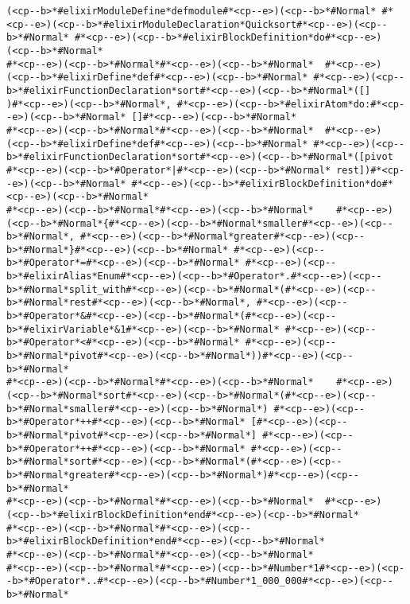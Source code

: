 \begin{lstlisting}[style=carbonpaper]
(<cp--b>*#elixirModuleDefine*defmodule#*<cp--e>)(<cp--b>*#Normal* #*<cp--e>)(<cp--b>*#elixirModuleDeclaration*Quicksort#*<cp--e>)(<cp--b>*#Normal* #*<cp--e>)(<cp--b>*#elixirBlockDefinition*do#*<cp--e>)(<cp--b>*#Normal*
#*<cp--e>)(<cp--b>*#Normal*#*<cp--e>)(<cp--b>*#Normal*  #*<cp--e>)(<cp--b>*#elixirDefine*def#*<cp--e>)(<cp--b>*#Normal* #*<cp--e>)(<cp--b>*#elixirFunctionDeclaration*sort#*<cp--e>)(<cp--b>*#Normal*([]            )#*<cp--e>)(<cp--b>*#Normal*, #*<cp--e>)(<cp--b>*#elixirAtom*do:#*<cp--e>)(<cp--b>*#Normal* []#*<cp--e>)(<cp--b>*#Normal*
#*<cp--e>)(<cp--b>*#Normal*#*<cp--e>)(<cp--b>*#Normal*  #*<cp--e>)(<cp--b>*#elixirDefine*def#*<cp--e>)(<cp--b>*#Normal* #*<cp--e>)(<cp--b>*#elixirFunctionDeclaration*sort#*<cp--e>)(<cp--b>*#Normal*([pivot #*<cp--e>)(<cp--b>*#Operator*|#*<cp--e>)(<cp--b>*#Normal* rest])#*<cp--e>)(<cp--b>*#Normal* #*<cp--e>)(<cp--b>*#elixirBlockDefinition*do#*<cp--e>)(<cp--b>*#Normal*
#*<cp--e>)(<cp--b>*#Normal*#*<cp--e>)(<cp--b>*#Normal*    #*<cp--e>)(<cp--b>*#Normal*{#*<cp--e>)(<cp--b>*#Normal*smaller#*<cp--e>)(<cp--b>*#Normal*, #*<cp--e>)(<cp--b>*#Normal*greater#*<cp--e>)(<cp--b>*#Normal*}#*<cp--e>)(<cp--b>*#Normal* #*<cp--e>)(<cp--b>*#Operator*=#*<cp--e>)(<cp--b>*#Normal* #*<cp--e>)(<cp--b>*#elixirAlias*Enum#*<cp--e>)(<cp--b>*#Operator*.#*<cp--e>)(<cp--b>*#Normal*split_with#*<cp--e>)(<cp--b>*#Normal*(#*<cp--e>)(<cp--b>*#Normal*rest#*<cp--e>)(<cp--b>*#Normal*, #*<cp--e>)(<cp--b>*#Operator*&#*<cp--e>)(<cp--b>*#Normal*(#*<cp--e>)(<cp--b>*#elixirVariable*&1#*<cp--e>)(<cp--b>*#Normal* #*<cp--e>)(<cp--b>*#Operator*<#*<cp--e>)(<cp--b>*#Normal* #*<cp--e>)(<cp--b>*#Normal*pivot#*<cp--e>)(<cp--b>*#Normal*))#*<cp--e>)(<cp--b>*#Normal*
#*<cp--e>)(<cp--b>*#Normal*#*<cp--e>)(<cp--b>*#Normal*    #*<cp--e>)(<cp--b>*#Normal*sort#*<cp--e>)(<cp--b>*#Normal*(#*<cp--e>)(<cp--b>*#Normal*smaller#*<cp--e>)(<cp--b>*#Normal*) #*<cp--e>)(<cp--b>*#Operator*++#*<cp--e>)(<cp--b>*#Normal* [#*<cp--e>)(<cp--b>*#Normal*pivot#*<cp--e>)(<cp--b>*#Normal*] #*<cp--e>)(<cp--b>*#Operator*++#*<cp--e>)(<cp--b>*#Normal* #*<cp--e>)(<cp--b>*#Normal*sort#*<cp--e>)(<cp--b>*#Normal*(#*<cp--e>)(<cp--b>*#Normal*greater#*<cp--e>)(<cp--b>*#Normal*)#*<cp--e>)(<cp--b>*#Normal*
#*<cp--e>)(<cp--b>*#Normal*#*<cp--e>)(<cp--b>*#Normal*  #*<cp--e>)(<cp--b>*#elixirBlockDefinition*end#*<cp--e>)(<cp--b>*#Normal*
#*<cp--e>)(<cp--b>*#Normal*#*<cp--e>)(<cp--b>*#elixirBlockDefinition*end#*<cp--e>)(<cp--b>*#Normal*
#*<cp--e>)(<cp--b>*#Normal*#*<cp--e>)(<cp--b>*#Normal*
#*<cp--e>)(<cp--b>*#Normal*#*<cp--e>)(<cp--b>*#Number*1#*<cp--e>)(<cp--b>*#Operator*..#*<cp--e>)(<cp--b>*#Number*1_000_000#*<cp--e>)(<cp--b>*#Normal*

\end{lstlisting}
